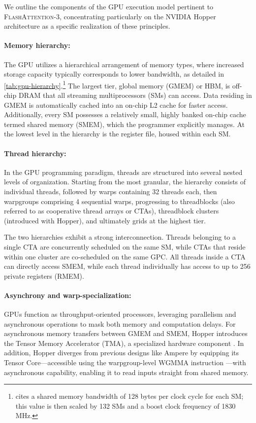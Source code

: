 We outline the components of the GPU execution model pertinent to \textsc{FlashAttention-3}, concentrating particularly on the NVIDIA Hopper architecture as a specific realization of these principles.

\paragraph{Memory hierarchy:} The GPU utilizes a hierarchical arrangement of memory types, where increased storage capacity typically corresponds to lower bandwidth, as detailed in \cref{tab:gpu-hierarchy}.\footnote{\citet{luo2024benchmarking} cites a shared memory bandwidth of 128 bytes per clock cycle for each SM; this value is then scaled by 132 SMs and a boost clock frequency of 1830 MHz.} The largest tier, global memory (GMEM) or HBM, is off-chip DRAM that all streaming multiprocessors (SMs) can access. Data residing in GMEM is automatically cached into an on-chip L2 cache for faster access. Additionally, every SM possesses a relatively small, highly banked on-chip cache termed shared memory (SMEM), which the programmer explicitly manages. At the lowest level in the hierarchy is the register file, housed within each SM.

\paragraph{Thread hierarchy:} In the GPU programming paradigm, threads are structured into several nested levels of organization. Starting from the most granular, the hierarchy consists of individual threads, followed by warps containing 32 threads each, then warpgroups comprising 4 sequential warps, progressing to threadblocks (also referred to as cooperative thread arrays or CTAs), threadblock clusters (introduced with Hopper), and ultimately grids at the highest tier.

The two hierarchies exhibit a strong interconnection. Threads belonging to a single CTA are concurrently scheduled on the same SM, while CTAs that reside within one cluster are co-scheduled on the same GPC. All threads inside a CTA can directly access SMEM, while each thread individually has access to up to 256 private registers (RMEM).

\paragraph{Asynchrony and warp-specialization:}

GPUs function as throughput-oriented processors, leveraging parallelism and asynchronous operations to mask both memory and computation delays. For asynchronous memory transfers between GMEM and SMEM, Hopper introduces the Tensor Memory Accelerator (TMA), a specialized hardware component \cite[\S7.29]{cuda}. In addition, Hopper diverges from previous designs like Ampere by equipping its Tensor Core—accessible using the warpgroup-level WGMMA instruction \cite[\S9.7.14]{ptx}—with asynchronous capability, enabling it to read inputs straight from shared memory.


